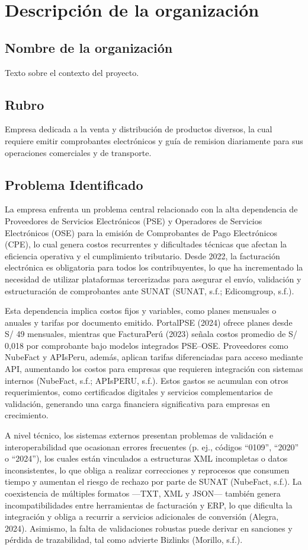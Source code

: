 \documentclass[12pt, a4paper]{article}
\begin{document}
\section{Descripción de la organización}

\subsection{Nombre de la organización}
Texto sobre el contexto del proyecto.

\subsection{Rubro}
Empresa dedicada a la venta y distribución de productos diversos, la cual requiere emitir comprobantes electrónicos y guía de remision diariamente para sus operaciones comerciales y de transporte.

\subsection{Problema Identificado}

La empresa enfrenta un problema central relacionado con la alta dependencia de Proveedores de Servicios Electrónicos (PSE) y Operadores de Servicios Electrónicos (OSE) para la emisión de Comprobantes de Pago Electrónicos (CPE), lo cual genera costos recurrentes y dificultades técnicas que afectan la eficiencia operativa y el cumplimiento tributario. Desde 2022, la facturación electrónica es obligatoria para todos los contribuyentes, lo que ha incrementado la necesidad de utilizar plataformas tercerizadas para asegurar el envío, validación y estructuración de comprobantes ante SUNAT (SUNAT, s.f.; Edicomgroup, s.f.).

Esta dependencia implica costos fijos y variables, como planes mensuales o anuales y tarifas por documento emitido. PortalPSE (2024) ofrece planes desde S/ 49 mensuales, mientras que FacturaPerú (2023) señala costos promedio de S/ 0,018 por comprobante bajo modelos integrados PSE–OSE. Proveedores como NubeFact y APIsPeru, además, aplican tarifas diferenciadas para acceso mediante API, aumentando los costos para empresas que requieren integración con sistemas internos (NubeFact, s.f.; APIsPERU, s.f.). Estos gastos se acumulan con otros requerimientos, como certificados digitales y servicios complementarios de validación, generando una carga financiera significativa para empresas en crecimiento.

A nivel técnico, los sistemas externos presentan problemas de validación e interoperabilidad que ocasionan errores frecuentes (p. ej., códigos “0109”, “2020” o “2024”), los cuales están vinculados a estructuras XML incompletas o datos inconsistentes, lo que obliga a realizar correcciones y reprocesos que consumen tiempo y aumentan el riesgo de rechazo por parte de SUNAT (NubeFact, s.f.). La coexistencia de múltiples formatos —TXT, XML y JSON— también genera incompatibilidades entre herramientas de facturación y ERP, lo que dificulta la integración y obliga a recurrir a servicios adicionales de conversión (Alegra, 2024). Asimismo, la falta de validaciones robustas puede derivar en sanciones y pérdida de trazabilidad, tal como advierte Bizlinks (Morillo, s.f.).
\end{document}
